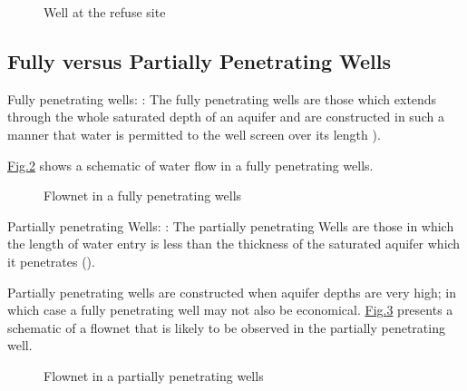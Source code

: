 \documentclass[letterpaper,10pt,english]{jupyterBook}
\begin{document}
\begin{figure}[htbp]
\centering
\capstart

\noindent{}
\caption{Well at the refuse site}\label{\detokenize{content/flow/L8/18_wells:well-refuse}}\end{figure}


\subsection{Fully versus Partially Penetrating Wells}
\label{\detokenize{content/flow/L8/18_wells:fully-versus-partially-penetrating-wells}}
\sphinxAtStartPar
Fully penetrating wells:
: The fully penetrating wells are those which extends through the whole saturated depth of an aquifer and are constructed in such a manner that water is permitted to the well screen over its length ).

\sphinxAtStartPar
\hyperref[\detokenize{content/flow/L8/18_wells:full-pen}]{Fig.\@ \ref{\detokenize{content/flow/L8/18_wells:full-pen}}} shows a schematic of water flow in a fully penetrating wells.

\begin{figure}[htbp]
\centering
\capstart

\noindent{}
\caption{Flownet in a fully penetrating wells}\label{\detokenize{content/flow/L8/18_wells:full-pen}}\end{figure}

\sphinxAtStartPar
Partially penetrating Wells:
: The partially penetrating Wells are those in which the length of water entry is less than the thickness of the saturated aquifer which it penetrates ().

\sphinxAtStartPar
Partially penetrating wells are constructed when aquifer depths are very high; in which case a fully penetrating well may not also be economical. \hyperref[\detokenize{content/flow/L8/18_wells:par-pen}]{Fig.\@ \ref{\detokenize{content/flow/L8/18_wells:par-pen}}} presents a schematic of a flownet that is likely to be observed in the partially penetrating well.

\begin{figure}[htbp]
\centering
\capstart

\noindent{}
\caption{Flownet in a partially penetrating wells}\label{\detokenize{content/flow/L8/18_wells:par-pen}}\end{figure}
\end{document}

